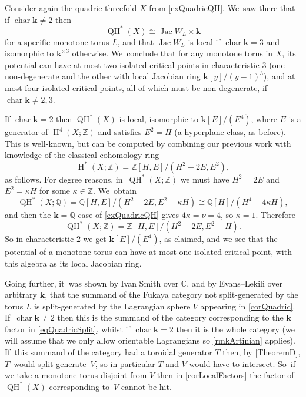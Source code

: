 \documentclass[JEP,XML,SOM,Unicode,NoEqCountersInSection,NoFloatCountersInSection,published]{cedram}
\theoremstyle{definition}
\newcommand{\CC}{\mathbb{C}}
\newcommand{\ZZ}{\mathbb{Z}}
\newcommand{\QQ}{\mathbb{Q}}
\newcommand{\kk}{{\boldsymbol{k}}}
\newcommand{\Char}{\operatorname{char}}
\newcommand{\rH}{\operatorname{H}}
\newcommand{\QH}{\operatorname{QH}}
\newcommand{\Jac}{\operatorname{Jac}}
\begin{document}
Consider again the quadric threefold $X$ from \cref{exQuadricQH}. We~saw there that if $\Char \kk \neq 2$ then
\begin{equation}
\label{eqQuadricSplit}
\QH^*(X) \cong \Jac W_L \times \kk
\end{equation}
for a specific monotone torus $L$, and that $\Jac W_L$ is local if $\Char \kk = 3$ and isomorphic to $\kk^{\times 3}$ otherwise. We~conclude that for any monotone torus in $X$, its potential can have at most two isolated critical points in characteristic $3$ (one non-degenerate and the other with local Jacobian ring $\kk[y]/(y-1)^3$), and at most four isolated critical points, all of which must be non-degenerate, if~$\Char \kk \neq 2, 3$.

If $\Char \kk = 2$ then $\QH^*(X)$ is local, isomorphic to $\kk[E] / (E^4)$, where $E$ is a generator of $\rH^4(X; \ZZ)$ and satisfies $E^2 = H$ (a hyperplane class, as before). This is well-known, but can be computed by combining our previous work with knowledge of the classical cohomology ring
\[
\rH^*(X; \ZZ) = \ZZ[H, E] / (H^2 - 2E, E^2),
\]
as follows. For degree reasons, in~$\QH^*(X; \ZZ)$ we must have $H^2 = 2E$ and $E^2 = \kappa H$ for some $\kappa \in \ZZ$. We~obtain
\[
\QH^*(X; \QQ) = \QQ[H, E] / (H^2 - 2E, E^2 - \kappa H) \cong \QQ[H] / (H^4 - 4\kappa H),
\]
and then the $\kk = \QQ$ case of \cref{exQuadricQH} gives $4 \kappa = \nu = 4$, so $\kappa = 1$. Therefore
\[
\QH^*(X; \ZZ) = \ZZ[H, E] / (H^2 - 2E, E^2 - H).
\]
So in characteristic $2$ we get $\kk[E] / (E^4)$, as claimed, and we see that the potential of a monotone torus can have at most one isolated critical point, with this algebra as its local Jacobian ring.

Going further, it~was shown by Ivan Smith \cite[Lem.\,4.6]{SmithQuadrics} over $\CC$, and by Evans--Lekili \cite[\S 7.1]{EvansLekiliGeneration} over arbitrary $\kk$, that the summand of the Fukaya category not split-generated by the torus $L$ is split-generated by the Lagrangian sphere $V$ appearing in \cref{corQuadric}. If~$\Char \kk \neq 2$ then this is the summand of the category corresponding to the $\kk$ factor in \eqref{eqQuadricSplit}, whilst if $\Char \kk = 2$ then it is the whole category (we will assume that we only allow orientable Lagrangians so \cref{rmkArtinian} applies). If~this summand of the category had a toroidal generator $T$ then, by \cref{TheoremD}, $T$~would split-generate~$V$, so in particular $T$ and $V$ would have to intersect. So~if we take a monotone torus disjoint from $V$ then in \cref{corLocalFactors} the factor of $\QH^*(X)$ corresponding to~$V$ cannot be hit.
\end{document}
